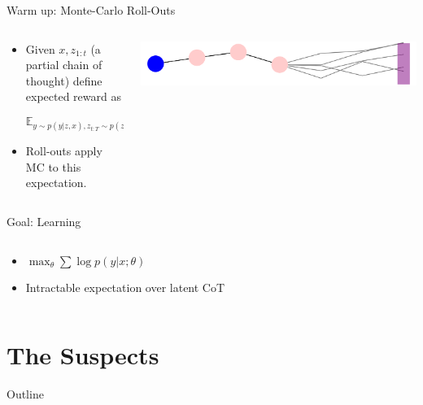 \documentclass[14pt,aspectratio=169]{beamer}
\begin{document}
\begin{frame}{Warm up: Monte-Carlo Roll-Outs}
	\begin{columns}
		\begin{column}{0.5\linewidth}
            \begin{itemize}
    			\item Given $x, z_{1:t}$ (a partial chain of thought) define expected reward as

    			$$\mathbb{E}_{y\sim p(y| z, x), z_{t:T} \sim p(z | z_{1:t}, x)}[Ver(y)]$$

    			\item Roll-outs apply MC to this expectation.
            \end{itemize}
		\end{column}
		\begin{column}{0.5\linewidth}
			\includegraphics[width=\textwidth]{images/mcroll.png}
		\end{column}
	\end{columns}
\end{frame}



\begin{frame}{Goal: Learning}
	\begin{columns}
		\begin{column}{0.5\linewidth}
			\begin{itemize}
				\item $\max_{\theta} \sum \log p(y | x; \theta)$
				\item Intractable expectation over latent CoT
			\end{itemize}
		\end{column}
		\begin{column}{0.5\linewidth}
		\end{column}
	\end{columns}
\end{frame}

\section{The Suspects}

\begin{frame}{Outline}
	\tableofcontents[hideallsubsections]
\end{frame}
\end{document}
